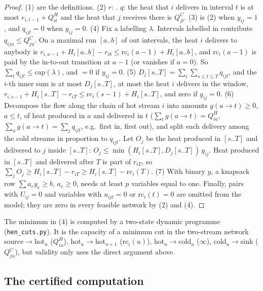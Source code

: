\documentclass[11pt,a4paper]{report}
\begin{document}
\begin{proof}
(1) are the definitions. (2) $r$: . $q$: the heat that $i$ delivers in interval $t$ is at most
$r_{i,t-1}+Q^H_{it}$ and the heat that $j$ receives there is $Q^C_{jt}$. (3) is (2) when $y_{ij}=1$, and
$q_{ijt}=0$ when $y_{ij}=0$. (4) Fix a labelling $\lambda$. Intervals labelled in contribute $q_{iju}\le Q^C_{ju}$. On
a maximal run $[a..b]$ of out intervals, the heat $i$ delivers to anybody is
$r_{i,a-1}+H_i[a..b]-r_{ib}\le\mathrm{rc}_i(a-1)+H_i[a..b]$, and $\mathrm{rc}_i(a-1)$ is paid by the in-to-out
transition at $a-1$ (or vanishes if $a=0$). So $\sum_tq_{ijt}\le\mathrm{cap}(\lambda)$, and $=0$ if $y_{ij}=0$.
(5) $D_j[s..T]=\sum_i\sum_{s\le t\le T}q_{ijt}$, and the $i$-th inner sum is at most $D_j[s..T]$, at most the heat
$i$ delivers in the window, $r_{i,s-1}+H_i[s..T]-r_{iT}\le\mathrm{rc}_i(s-1)+H_i[s..T]$, and zero if $y_{ij}=0$.
(6) Decompose the flow along the chain of hot stream $i$ into amounts $g(a\to t)\ge0$, $a\le t$, of heat produced in
$a$ and delivered in $t$ ($\sum_tg(a\to t)=Q^H_{ia}$, $\sum_ag(a\to t)=\sum_jq_{ijt}$, e.g.\ first in, first out),
and split each delivery among the cold streams in proportion to $q_{ijt}$. Let $O_j$ be the heat produced in
$[s..T]$ and delivered to $j$ inside $[s..T]$: $O_j\le\min(H_i[s..T],D_j[s..T])\,y_{ij}$. Heat produced in $[s..T]$
and delivered after $T$ is part of $r_{iT}$, so $\sum_jO_j\ge H_i[s..T]-r_{iT}\ge H_i[s..T]-\mathrm{rc}_i(T)$.
(7) With binary $y$, a knapsack row $\sum a_ey_e\ge b$, $a_e\ge0$, needs at least $p$ variables equal to one.
Finally, pairs with $U_{ij}=0$ and variables with $u_{ijt}=0$ or $\mathrm{rc}_i(t)=0$ are omitted from the model;
they are zero in every feasible network by (2) and (4).
\end{proof}

The minimum in (4) is computed by a two-state dynamic programme (\texttt{hen\_cuts.py}). It is the capacity of a
minimum cut in the two-stream network source${}\to{}$hot$_u$ ($Q^H_{iu}$), hot$_u\to{}$hot$_{u+1}$
($\mathrm{rc}_i(u)$), hot$_u\to{}$cold$_u$ ($\infty$), cold$_u\to{}$sink ($Q^C_{ju}$), but validity only uses the
direct argument above.

\subsection{The certified computation}
\end{document}
